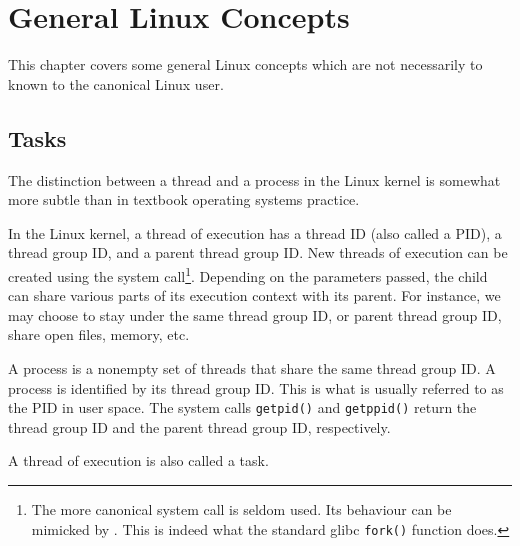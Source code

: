 
\chapter{General Linux Concepts}

This chapter covers some general Linux concepts which are not necessarily to
known to the canonical Linux user.

\section{Tasks}

\label{appendix:general-linux-concepts:tasks}

The distinction between a thread and a process in the Linux kernel is somewhat
more subtle than in textbook operating systems practice.

In the Linux kernel, a thread of execution has a thread ID (also called a PID),
a thread group ID, and a parent thread group ID. New threads of execution can
be created using the \cite{man-2-clone} system call\footnote{The more canonical
\cite{man-2-fork} system call is seldom used. Its behaviour can be mimicked by
\cite{man-2-clone}. This is indeed what the standard glibc \texttt{fork()}
function does.}. Depending on the parameters passed, the child can share
various parts of its execution context with its parent. For instance, we may
choose to stay under the same thread group ID, or parent thread group ID, share
open files, memory, etc.

A process is a nonempty set of threads that share the same thread group ID. A
process is identified by its thread group ID. This is what is usually referred
to as the PID in user space. The system calls \texttt{getpid()} and
\texttt{getppid()} return the thread group ID and the parent thread group ID,
respectively.

A thread of execution is also called a task.
